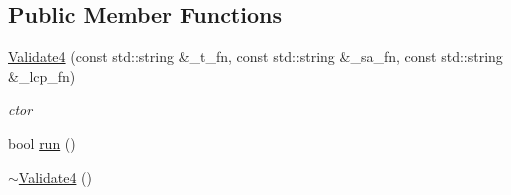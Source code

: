 \subsection*{Public Member Functions}
\begin{DoxyCompactItemize}
\item 
\hyperlink{class_validate4_aa1e9bf045b028c339da30db955857cb9}{Validate4} (const std\+::string \&\+\_\+t\+\_\+fn, const std\+::string \&\+\_\+sa\+\_\+fn, const std\+::string \&\+\_\+lcp\+\_\+fn)
\begin{DoxyCompactList}\small\item\em ctor \end{DoxyCompactList}\item 
bool \hyperlink{class_validate4_a6ec70437413135bc1a00c7c2310ece46}{run} ()
\item 
\hyperlink{class_validate4_a4098c3ea14d8a58ac6bf2aae8fa6071e}{$\sim$\+Validate4} ()
\end{DoxyCompactItemize}
